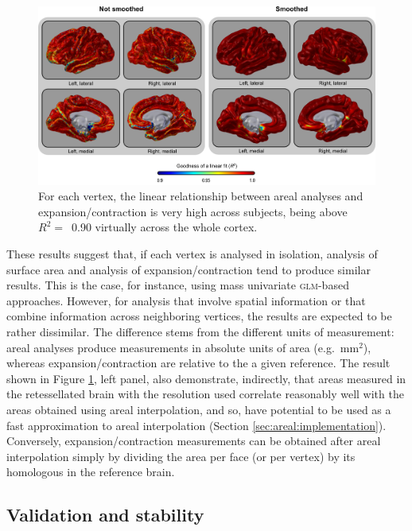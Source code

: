 \begin{figure}[!tp]  %
\centering
\includegraphics[width=14cm]{images/spatialfit.png}
\caption[Comparison with expansion/contraction methods (\textsc{iii}).]{For each vertex, the linear relationship between areal analyses and expansion/contraction is very high across subjects, being above $R^2=$~0.90 virtually across the whole cortex.}
\label{fig:areal:spatialfit}
\end{figure}

These results suggest that, if each vertex is analysed in isolation, analysis of surface area and analysis of expansion/contraction tend to produce similar results. This is the case, for instance, using mass univariate \textsc{glm}-based approaches. However, for analysis that involve spatial information or that combine information across neighboring vertices, the results are expected to be rather dissimilar. The difference stems from the different units of measurement: areal analyses produce measurements in absolute units of area (e.g.\ mm$^2$), whereas expansion/contraction are relative to the a given reference. The result shown in Figure \ref{fig:areal:spatialfit}, left panel, also demonstrate, indirectly, that areas measured in the retessellated brain with the resolution used correlate reasonably well with the areas obtained using areal interpolation, and so, have potential to be used as a fast approximation to areal interpolation (Section \ref{sec:areal:implementation}). Conversely, expansion/contraction measurements can be obtained after areal interpolation simply by dividing the area per face (or per vertex) by its homologous in the reference brain.

\subsection{Validation and stability}

